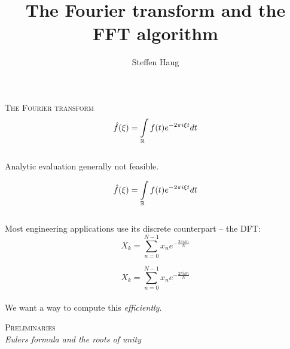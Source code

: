 \documentclass[14pt]{beamer}
\title{The Fourier transform and the FFT algorithm}
\author{Steffen Haug}
\date{}
\newcommand{\Exp}[1]{e^{#1}}
\begin{document}
\begin{frame}
\titlepage
\end{frame}

\begin{frame}
    \centering
    \textsc{The Fourier transform}\\[1em]
    \begin{equation}
        \hat f (\xi) = \int\displaylimits_{\mathbb R} f(t) \Exp{-2 \pi i \xi t } dt
    \end{equation}\\[1em]

    \pause
    Analytic evaluation generally not feasible.
\end{frame}

\begin{frame}
    \begin{equation*}
        \hat f (\xi) = \int\displaylimits_{\mathbb R} f(t) \Exp{-2 \pi i \xi t } dt
    \end{equation*}\\[1em]

    Most engineering applications use its discrete counterpart -- the DFT:
    \begin{equation}
    X_k = \sum_{n=0}^{N-1} x_n \Exp{-\frac {2 \pi i k n} N}
    \label{eq:dft}
    \end{equation}
\end{frame}

\begin{frame}
    \begin{equation*}
    X_k = \sum_{n=0}^{N-1} x_n \Exp{-\frac {2 \pi i k n} N}
    \label{eq:dft}
    \end{equation*}\\[1em]
    \centering
    We want a way to compute this \textit{efficiently}.
\end{frame}



\begin{frame}
    \centering
    \textsc{\large Preliminaries}\\
    \textit{\scriptsize Eulers formula and the roots of unity}
\end{frame}


\end{document}
